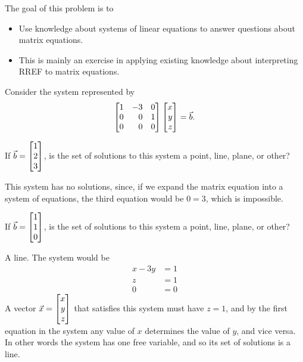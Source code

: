 \documentclass{problemset}
\newcommand{\bookonlynewpage}{\begin{bookonly}\newpage\end{bookonly}}
\begin{document}
	\bookonlynewpage
	\question
	\begin{annotation}
		\begin{goals}

			The goal of this problem is to
			\begin{itemize}
				\item Use knowledge about systems of linear equations to answer questions
					about matrix equations.
			\end{itemize}
		\end{goals}

		\begin{notes}
			\begin{itemize}
				\item This is mainly an exercise in applying existing knowledge about
					interpreting RREF to matrix equations.
			\end{itemize}
		\end{notes}
	\end{annotation}
	Consider the system represented by
	\[
		\mat{1&-3&0\\0&0&1\\0&0&0}\mat{x\\y\\z}=\vec b.
	\]
	\begin{parts}
		\item If $\vec b=\mat{1\\2\\3}$, is the set of solutions to this system
			a point, line, plane, or other?
			\begin{solution}
				This system has no solutions, since, if we expand the matrix
				equation into a system of equations, the third equation would be
				$0=3$, which is impossible.
			\end{solution}
		\item If $\vec b=\mat{1\\1\\0}$, is the set of solutions to this system
			a point, line, plane, or other?
			\begin{solution}
				A line. The system would be
				\begin{align*}
					x - 3y &= 1 \\
					z &= 1 \\
					0 &= 0
				\end{align*}
				A vector $\vec x=\mat{x\\y\\z}$ that satisfies this system must have
				$z=1$, and by the first equation in the system any value of $x$
				determines the value of $y$, and vice versa. In other words the
				system has one free variable, and so its set of solutions is a line.
			\end{solution}
	\end{parts}
\end{document}
